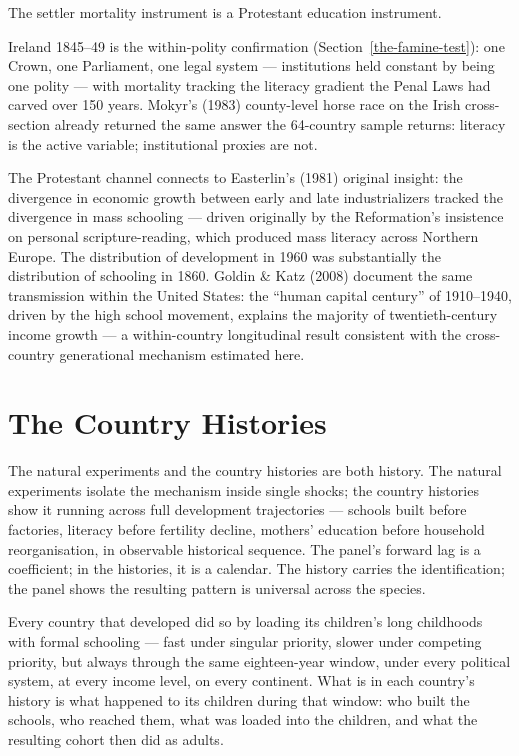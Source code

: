 \documentclass[12pt,letterpaper]{article}
\begin{document}
The settler mortality instrument is a
Protestant education instrument.

Ireland 1845--49 is the within-polity confirmation
(Section~\ref{the-famine-test}): one Crown, one Parliament, one legal
system --- institutions held constant by being one polity --- with
mortality tracking the literacy gradient the Penal Laws had carved over
150 years. Mokyr's (1983) county-level horse race on the Irish
cross-section already returned the same answer the 64-country sample
returns: literacy is the active variable; institutional proxies are not.

The Protestant channel connects to Easterlin's (1981) original insight:
the divergence in economic growth between early and late industrializers
tracked the divergence in mass schooling --- driven originally by the
Reformation's insistence on personal scripture-reading, which produced
mass literacy across Northern Europe. The distribution of development in
1960 was substantially the distribution of schooling in 1860. Goldin \&
Katz (2008) document the same transmission within the United States: the
``human capital century'' of 1910--1940, driven by the high school
movement, explains the majority of twentieth-century income growth --- a
within-country longitudinal result consistent with the cross-country
generational mechanism estimated here.

\section{The Country Histories}\label{country-histories}

The natural experiments and the country histories are both history. The natural experiments isolate the mechanism inside single shocks; the country histories show it running across full development trajectories --- schools built before factories, literacy before fertility decline, mothers' education before household reorganisation, in observable historical sequence. The panel's forward lag is a coefficient; in the histories, it is a calendar. The history carries the identification; the panel shows the resulting pattern is universal across the species.

Every country that developed did so by loading its children's long childhoods with formal schooling --- fast under singular priority, slower under competing priority, but always through the same eighteen-year window, under every political system, at every income level, on every continent. What is in each country's history is what happened to its children during that window: who built the schools, who reached them, what was loaded into the children, and what the resulting cohort then did as adults.
\end{document}
